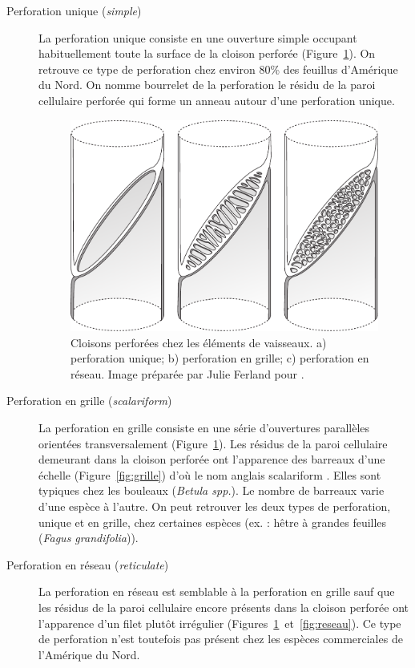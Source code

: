 \begin{description}
\item[Perforation unique (\textit{simple})] La perforation unique consiste en une ouverture simple occupant habituellement toute la surface de la cloison perforée (Figure~\ref{fig:cloisons}). On retrouve ce type de perforation chez environ 80\% des feuillus d'Amérique du Nord. On nomme bourrelet de la perforation le résidu de la paroi cellulaire perforée qui forme un anneau autour d'une perforation unique.

\begin{figure}[h]
	\centering
	\includegraphics[scale=0.6]{img/ch4_perforation_cloison}
	\caption{Cloisons perforées chez les éléments de vaisseaux.  a) perforation unique; b) perforation en grille; c) perforation en réseau. Image préparée par Julie Ferland pour \cite{achim2010dendroecologie}.}
	\label{fig:cloisons}
\end{figure}

\item[Perforation en grille (\textit{scalariform})] La perforation en grille consiste en une série d'ouvertures parallèles orientées transversalement (Figure~\ref{fig:cloisons}). Les résidus de la paroi cellulaire demeurant dans la cloison perforée ont l'apparence des barreaux d'une échelle (Figure~\ref{fig:grille}) d'où le nom anglais \og scalariform \fg. Elles sont typiques chez les bouleaux (\textit{Betula spp.}). Le nombre de barreaux varie d'une espèce à l'autre.  On peut retrouver les deux types de perforation, unique et en grille, chez certaines espèces (ex. : hêtre à grandes feuilles (\textit{Fagus grandifolia})).

\item[Perforation en réseau (\textit{reticulate})] La perforation en réseau est semblable à la perforation en grille sauf que les résidus de la paroi cellulaire encore présents dans la cloison perforée ont l'apparence d'un filet plutôt irrégulier (Figures~\ref{fig:cloisons}~et~\ref{fig:reseau}). Ce type de perforation n'est toutefois pas présent chez les espèces commerciales de l'Amérique du Nord.
\end{description}

